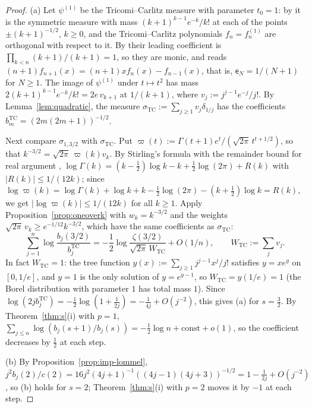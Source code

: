 \begin{proof}
(a) Let $\psi^{(1)}$ be the Tricomi--Carlitz measure with parameter $t_0=1$: by \cite[(1.4)--(1.5)]{WLXZ} it is the
symmetric measure with mass $(k+1)^{k-1}e^{-k}/k!$ at each of the points $\pm(k+1)^{-1/2}$, $k\ge0$, and the
Tricomi--Carlitz polynomials $f_n=f^{(1)}_n$ are orthogonal with respect to it. By \cite[(1.9)]{WLXZ} their leading
coefficient is $\prod_{k<n}(k+1)/(k+1)=1$, so they are monic, and \cite[(1.6)]{WLXZ} reads
$(n+1)f_{n+1}(x)=(n+1)xf_n(x)-f_{n-1}(x)$, that is, $\mathsf e_N=1/(N+1)$ for $N\ge1$. The image of $\psi^{(1)}$ under
$t\mapsto t^2$ has mass $2(k+1)^{k-1}e^{-k}/k!=2e\,v_{k+1}$ at $1/(k+1)$, where $v_j:=j^{j-1}e^{-j}/j!$. By
Lemma~\ref{lem:quadratic}, the measure $\sigma_{\mathrm{TC}}:=\sum_{j\ge1}v_j\delta_{1/j}$ has the coefficients
$b^{\mathrm{TC}}_m=(2m(2m+1))^{-1/2}$.

Next compare $\sigma_{1,3/2}$ with $\sigma_{\mathrm{TC}}$. Put $\varpi(t):=\Gamma(t+1)e^t/(\sqrt{2\pi}\,t^{t+1/2})$, so that
$k^{-3/2}=\sqrt{2\pi}\,\varpi(k)v_k$. By Stirling's formula with the remainder bound for real argument \cite[(5.11.1) and
\S5.11(ii)]{DLMF}, $\log\Gamma(k)=(k-\frac12)\log k-k+\frac12\log(2\pi)+R(k)$ with $|R(k)|\le1/(12k)$; since
$\log\varpi(k)=\log\Gamma(k)+\log k+k-\frac12\log(2\pi)-(k+\frac12)\log k=R(k)$, we get $|\log\varpi(k)|\le1/(12k)$ for
all $k\ge1$. Apply Proposition~\ref{prop:oneoverk} with $w_k=k^{-3/2}$ and the weights $\sqrt{2\pi}\,v_k\ge
e^{-1/12}k^{-3/2}$, which have the same coefficients as $\sigma_{\mathrm{TC}}$:
\[
  \sum_{j=1}^n\log\frac{b_j(3/2)}{b^{\mathrm{TC}}_j}=-\frac12\log\frac{\zeta(3/2)}{\sqrt{2\pi}\,W_{\mathrm{TC}}}+O(1/n),
  \qquad W_{\mathrm{TC}}:=\sum_jv_j .
\]
In fact $W_{\mathrm{TC}}=1$: the tree function $y(x):=\sum_{j\ge1}j^{j-1}x^j/j!$ satisfies $y=xe^{y}$ on $[0,1/e]$, and
$y=1$ is the only solution of $y=e^{y-1}$, so $W_{\mathrm{TC}}=y(1/e)=1$ (the Borel distribution with parameter $1$ has
total mass $1$).
Since $\log(2jb^{\mathrm{TC}}_j)=-\frac12\log(1+\frac1{2j})=-\frac1{4j}+O(j^{-2})$, this gives (a) for $s=\frac32$. By
Theorem~\ref{thm:s}(i) with $p=1$, $\sum_{j\le n}\log(b_j(s+1)/b_j(s))=-\frac12\log n+\mathrm{const}+o(1)$, so the
coefficient decreases by $\frac12$ at each step.

(b) By Proposition~\ref{prop:imp-lommel}, $j^2b_j(2)/c(2)=16j^2(4j+1)^{-1}((4j-1)(4j+3))^{-1/2}=1-\frac1{2j}+O(j^{-2})$, so
(b) holds for $s=2$; Theorem~\ref{thm:s}(i) with $p=2$ moves it by $-1$ at each step.
\end{proof}

